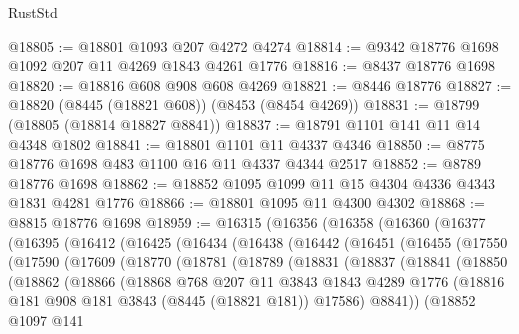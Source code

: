 \begin{lexlean}{RustStd}
\begin{coremodule}
@18805 := @18801 @1093 @207 @4272 @4274
@18814 := @9342 @18776 @1698 @1092 @207 @11 @4269 @1843 @4261 @1776
@18816 := @8437 @18776 @1698
@18820 := @18816 @608 @908 @608 @4269
@18821 := @8446 @18776
@18827 := @18820 (@8445 (@18821 @608)) (@8453 (@8454 @4269))
@18831 := @18799 (@18805 (@18814 @18827 @8841))
@18837 := @18791 @1101 @141 @11 @14 @4348 @1802
@18841 := @18801 @1101 @11 @4337 @4346
@18850 := @8775 @18776 @1698 @483 @1100 @16 @11 @4337 @4344 @2517
@18852 := @8789 @18776 @1698
@18862 := @18852 @1095 @1099 @11 @15 @4304 @4336 @4343 @1831 @4281 @1776
@18866 := @18801 @1095 @11 @4300 @4302
@18868 := @8815 @18776 @1698
@18959 := @16315
    (@16356
      (@16358
        (@16360
          (@16377
            (@16395
              (@16412
                (@16425
                  (@16434
                    (@16438
                      (@16442
                        (@16451
                          (@16455
                            (@17550
                              (@17590
                                (@17609
                                  (@18770
                                    (@18781
                                      (@18789
                                        (@18831
                                          (@18837
                                            (@18841
                                              (@18850
                                                (@18862
                                                  (@18866
                                                    (@18868
                                                      @768
                                                      @207
                                                      @11
                                                      @3843
                                                      @1843
                                                      @4289
                                                      @1776
                                                      (@18816
                                                        @181
                                                        @908
                                                        @181
                                                        @3843
                                                        (@8445 (@18821 @181))
                                                        @17586)
                                                      @8841))
                                                  (@18852
                                                    @1097
                                                    @141

\end{coremodule}
\end{lexlean}

